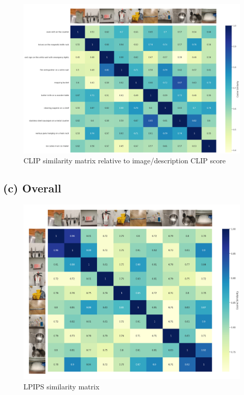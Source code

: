\documentclass[]{article}
\begin{document}
\begin{figure}[h]
    \includegraphics[width=18cm]{scores/cliprelativescores.png}
    \caption{CLIP similarity matrix relative to image/description CLIP score}
\end{figure}

\clearpage
\subsection{(c) Overall}
\begin{figure}[h]
    \includegraphics[width=16cm]{scores/lpipscore.png}
    \caption{LPIPS similarity matrix}
\end{figure}
\end{document}
